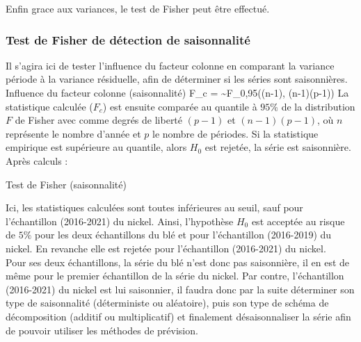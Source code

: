 Enfin grace aux variances, le test de Fisher peut être effectué.
\subsubsection*{Test de Fisher de détection de saisonnalité}
Il s'agira ici de tester l'influence du facteur colonne en comparant la variance période à la variance résiduelle, afin de déterminer si les séries sont saisonnières.
    {Influence du facteur colonne (saisonnalité)}
    {F_{c} =  \sim F_{0,95}((n-1), (n-1)(p-1))}
La statistique calculée ($F_{c}$) est ensuite comparée au quantile à $95\%$ de la distribution $F$ de Fisher avec comme degrés de liberté $(p-1)$ et $(n-1)(p-1)$, où $n$ 
représente le nombre d'année et $p$ le nombre de périodes. Si la statistique empirique est supérieure au quantile, alors $ H_{0} $ est rejetée, la série est saisonnière. 
Après calculs :
\begin{table}[H]
    \centering
    \caption{Test de Fisher (saisonnalité)}
    \sffamily
    
\end{table}
Ici, les statistiques calculées sont toutes inférieures au seuil, sauf pour l'échantillon (2016-2021)
du nickel.  Ainsi, l'hypothèse $H_{0}$ est acceptée au risque de $5\%$ pour les deux échantillons du blé
et pour l'échantillon (2016-2019) du nickel. En revanche elle est rejetée pour l'échantillon (2016-2021) du nickel.\\[11pt]
Pour ses deux échantillons, la série du blé n'est donc pas saisonnière, il en est de même pour le premier échantillon de la série du nickel. 
Par contre, l'échantillon (2016-2021) du nickel est lui saisonnier, il faudra donc par la suite 
déterminer son type de saisonnalité (déterministe ou aléatoire), puis son type de schéma de décomposition
(additif ou multiplicatif) et finalement désaisonnaliser la série afin de pouvoir utiliser les méthodes de prévision.
